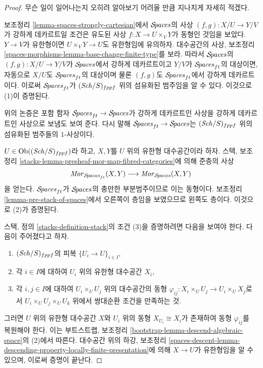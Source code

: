 \begin{proof}
무슨 일이 일어나는지 오히려 알아보기 어려울 만큼 지나치게 자세히 적겠다.

\medskip\noindent
보조정리 \ref{lemma-spaces-strongly-cartesian}에서 $\mathcal{S}\!\mathit{paces}$의 사상
$(f, g) : X/U \to Y/V$가 강하게 데카르트일 조건은 유도된 사상
$f : X \to U \times_V Y$가 동형인 것임을 보았다. $Y \to V$가 유한형이면
$U \times_V Y \to U$도 유한형임에 유의하자. 대수공간의 사상, 보조정리
\ref{spaces-morphisms-lemma-base-change-finite-type}를 보라. 따라서
$\mathcal{S}\!\mathit{paces}$의 $(f, g) : X/U \to Y/V$가 $\mathcal{S}\!\mathit{paces}$에서 강하게
데카르트이고 $Y/V$가 $\mathcal{S}\!\mathit{paces}_{ft}$의 대상이면, 자동으로 $X/U$도
$\mathcal{S}\!\mathit{paces}_{ft}$의 대상이며 물론 $(f, g)$도 $\mathcal{S}\!\mathit{paces}_{ft}$에서
강하게 데카르트이다. 이로써 $\mathcal{S}\!\mathit{paces}_{ft}$가 $(\mathit{Sch}/S)_{fppf}$ 위의
섬유화된 범주임을 알 수 있다. 이것으로 (1)이 증명된다.

\medskip\noindent
위의 논증은 포함 함자 $\mathcal{S}\!\mathit{paces}_{ft} \to \mathcal{S}\!\mathit{paces}$가 강하게
데카르트인 사상을 강하게 데카르트인 사상으로 보냄도 보여 준다. 다시 말해
$\mathcal{S}\!\mathit{paces}_{ft} \to \mathcal{S}\!\mathit{paces}$는 $(\mathit{Sch}/S)_{fppf}$ 위의 섬유화된
범주들의 $1$-사상이다.

\medskip\noindent
$U \in \mathop{\mathrm{Ob}}\nolimits((\mathit{Sch}/S)_{fppf})$라 하고, $X, Y$를 $U$ 위의 유한형
대수공간이라 하자. 스택, 보조정리
\ref{stacks-lemma-presheaf-mor-map-fibred-categories}에 의해 준층의 사상
$$
\mathit{Mor}_{\mathcal{S}\!\mathit{paces}_{ft}}(X, Y)
\longrightarrow
\mathit{Mor}_{\mathcal{S}\!\mathit{paces}}(X, Y)
$$
을 얻는다. $\mathcal{S}\!\mathit{paces}_{ft}$가 $\mathcal{S}\!\mathit{paces}$의 충만한 부분범주이므로
이는 동형이다. 보조정리 \ref{lemma-pre-stack-of-spaces}에서 오른쪽이
층임을 보였으므로 왼쪽도 층이다. 이것으로 (2)가 증명된다.

\medskip\noindent
스택, 정의 \ref{stacks-definition-stack}의 조건 (3)을 증명하려면 다음을
보여야 한다. 다음이 주어졌다고 하자.
\begin{enumerate}
\item $(\mathit{Sch}/S)_{fppf}$의 피복 $\{U_i \to U\}_{i \in I}$,
\item 각 $i \in I$에 대하여 $U_i$ 위의 유한형 대수공간 $X_i$,
\item 각 $i, j \in I$에 대하여 $U_i \times_U U_j$ 위의 대수공간의 동형
$\varphi_{ij} : X_i \times_U U_j \to U_i \times_U X_j$로서
$U_i \times_U U_j \times_U U_k$ 위에서 쌍대순환 조건을 만족하는 것.
\end{enumerate}
그러면 $U$ 위의 유한형 대수공간 $X$와 $U_i$ 위의 동형
$X_{U_i} \cong X_i$가 존재하여 동형 $\varphi_{ij}$를 복원해야 한다. 이는
부트스트랩, 보조정리 \ref{bootstrap-lemma-descend-algebraic-space}의 (2)에서
따른다. 대수공간 위의 하강, 보조정리
\ref{spaces-descent-lemma-descending-property-locally-finite-presentation}에
의해 $X \to U$가 유한형임을 알 수 있으며, 이로써 증명이 끝난다.
\end{proof}

